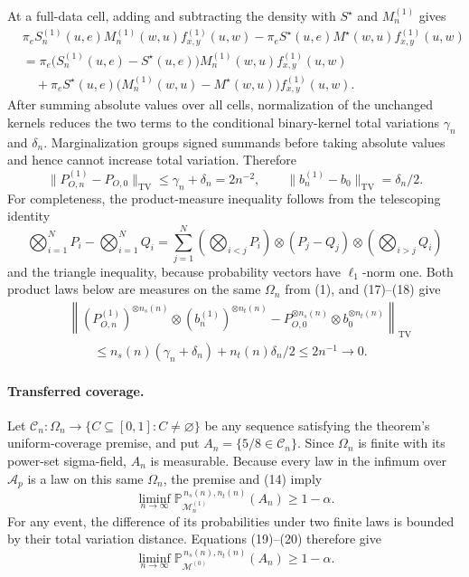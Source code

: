 At a full-data cell, adding and subtracting the density with \(S^{\star}\) and \(M^{(1)}_n\) gives
\[
\begin{aligned}
&\pi_eS^{(1)}_n(u,e)M^{(1)}_n(w,u)f^{(1)}_{x,y}(u,w)
-\pi_eS^{\star}(u,e)M^{\star}(w,u)f^{(1)}_{x,y}(u,w)\\
&=\pi_e\bigl(S^{(1)}_n(u,e)-S^{\star}(u,e)\bigr)
M^{(1)}_n(w,u)f^{(1)}_{x,y}(u,w)\\
&\quad+\pi_eS^{\star}(u,e)
\bigl(M^{(1)}_n(w,u)-M^{\star}(w,u)\bigr)
f^{(1)}_{x,y}(u,w).
\end{aligned}
\]
After summing absolute values over all cells, normalization of the unchanged kernels reduces the two terms to the conditional binary-kernel total variations \(\gamma_n\) and \(\delta_n\). Marginalization groups signed summands before taking absolute values and hence cannot increase total variation. Therefore
\[
\lVert P^{(1)}_{O,n}-P_{O,0}\rVert_{\mathrm{TV}}
\le\gamma_n+\delta_n=2n^{-2},
\qquad
\lVert b^{(1)}_n-b_0\rVert_{\mathrm{TV}}=\delta_n/2.
\tag{17}
\]
For completeness, the product-measure inequality follows from the telescoping identity
\[
\bigotimes_{i=1}^N P_i-\bigotimes_{i=1}^N Q_i
=\sum_{j=1}^N
\left(\bigotimes_{i<j}P_i\right)\otimes(P_j-Q_j)\otimes
\left(\bigotimes_{i>j}Q_i\right)
\tag{18}
\]
and the triangle inequality, because probability vectors have \(\ell_1\)-norm one. Both product laws below are measures on the same \(\Omega_n\) from (1), and (17)--(18) give
\[
\begin{aligned}
&\left\lVert
(P^{(1)}_{O,n})^{\otimes n_s(n)}\otimes(b^{(1)}_n)^{\otimes n_t(n)}
-P_{O,0}^{\otimes n_s(n)}\otimes b_0^{\otimes n_t(n)}
\right\rVert_{\mathrm{TV}}\\
&\qquad\le n_s(n)(\gamma_n+\delta_n)+n_t(n)\delta_n/2
\le2n^{-1}\longrightarrow0.
\end{aligned}
\tag{19}
\]

\paragraph{Transferred coverage.}
Let \(\mathcal C_n:\Omega_n\to\{C\subseteq[0,1]:C\ne\varnothing\}\) be any sequence satisfying the theorem's uniform-coverage premise, and put \(A_n=\{5/8\in\mathcal C_n\}\). Since \(\Omega_n\) is finite with its power-set sigma-field, \(A_n\) is measurable. Because every law in the infimum over \(\mathcal A_p\) is a law on this same \(\Omega_n\), the premise and (14) imply
\[
\liminf_{n\to\infty}
\mathbb P_{\mathcal M^{(1)}_n}^{\,n_s(n),n_t(n)}(A_n)
\ge1-\alpha.
\tag{20}
\]
For any event, the difference of its probabilities under two finite laws is bounded by their total variation distance. Equations (19)--(20) therefore give
\[
\liminf_{n\to\infty}
\mathbb P_{\mathcal M^{(0)}}^{\,n_s(n),n_t(n)}(A_n)
\ge1-\alpha.
\tag{21}
\]

